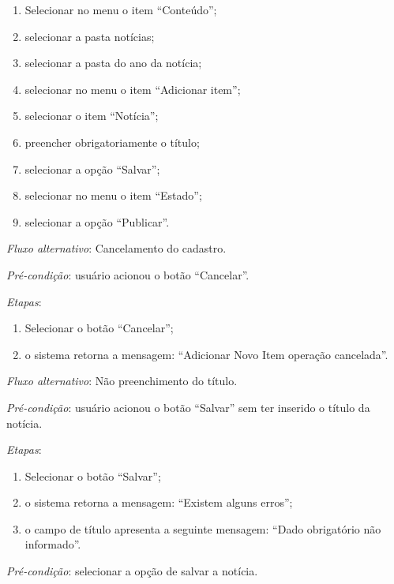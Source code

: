 \begin{enumerate}
    \item Selecionar no menu o item ``Conteúdo'';
    \item selecionar a pasta notícias;
    \item selecionar a pasta do ano da notícia;
    \item selecionar no menu o item ``Adicionar item'';
    \item selecionar o item ``Notícia'';
    \item preencher obrigatoriamente o título;
    \item selecionar a opção ``Salvar'';
    \item selecionar no menu o item ``Estado'';
    \item selecionar a opção ``Publicar''.
\end{enumerate}

\noindent \textit{Fluxo alternativo}: Cancelamento do cadastro.

\noindent \textit{Pré-condição}:  usuário acionou o botão ``Cancelar''.

\noindent \textit{Etapas}:

\begin{enumerate}
    \item Selecionar o botão ``Cancelar'';
    \item o sistema retorna a mensagem: ``Adicionar Novo Item operação cancelada''.
\end{enumerate}

\noindent \textit{Fluxo alternativo}: Não preenchimento do título.

\noindent \textit{Pré-condição}: usuário acionou o botão ``Salvar'' sem ter inserido o título da notícia.

\noindent \textit{Etapas}:

\begin{enumerate}
    \item Selecionar o botão ``Salvar'';
    \item o sistema retorna a mensagem: ``Existem alguns erros'';
    \item o campo de título apresenta a seguinte mensagem: ``Dado obrigatório não informado''.
\end{enumerate}




\vspace{0.7cm}

\noindent \textit{Pré-condição}: selecionar a opção de salvar a notícia.

